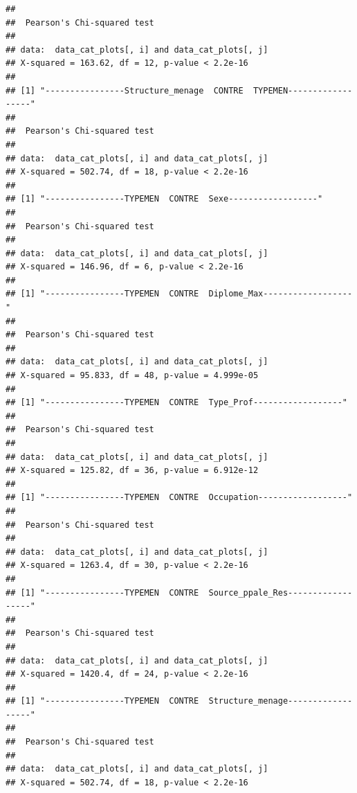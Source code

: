 \documentclass[11pt,a4paper, x11names]{article}\usepackage[]{graphicx}\usepackage[]{color}
\makeatletter
\newenvironment{kframe}{%
 \def\at@end@of@kframe{}%
 \ifinner\ifhmode%
  \def\at@end@of@kframe{\end{minipage}}%
  \begin{minipage}{\columnwidth}%
 \fi\fi%
 \def\FrameCommand##1{\hskip\@totalleftmargin \hskip-\fboxsep
 \colorbox{shadecolor}{##1}\hskip-\fboxsep
     \hskip-\linewidth \hskip-\@totalleftmargin \hskip\columnwidth}%
 \MakeFramed {\advance\hsize-\width
   \@totalleftmargin\z@ \linewidth\hsize
   \@setminipage}}%
 {\par\unskip\endMakeFramed%
 \at@end@of@kframe}
\newenvironment{knitrout}{}{} %
\makeatother
\begin{document}
\begin{knitrout}
\begin{kframe}
\begin{verbatim}
## 
## 	Pearson's Chi-squared test
## 
## data:  data_cat_plots[, i] and data_cat_plots[, j]
## X-squared = 163.62, df = 12, p-value < 2.2e-16
## 
## [1] "----------------Structure_menage  CONTRE  TYPEMEN------------------"
## 
## 	Pearson's Chi-squared test
## 
## data:  data_cat_plots[, i] and data_cat_plots[, j]
## X-squared = 502.74, df = 18, p-value < 2.2e-16
## 
## [1] "----------------TYPEMEN  CONTRE  Sexe------------------"
## 
## 	Pearson's Chi-squared test
## 
## data:  data_cat_plots[, i] and data_cat_plots[, j]
## X-squared = 146.96, df = 6, p-value < 2.2e-16
## 
## [1] "----------------TYPEMEN  CONTRE  Diplome_Max------------------"
## 
## 	Pearson's Chi-squared test
## 
## data:  data_cat_plots[, i] and data_cat_plots[, j]
## X-squared = 95.833, df = 48, p-value = 4.999e-05
## 
## [1] "----------------TYPEMEN  CONTRE  Type_Prof------------------"
## 
## 	Pearson's Chi-squared test
## 
## data:  data_cat_plots[, i] and data_cat_plots[, j]
## X-squared = 125.82, df = 36, p-value = 6.912e-12
## 
## [1] "----------------TYPEMEN  CONTRE  Occupation------------------"
## 
## 	Pearson's Chi-squared test
## 
## data:  data_cat_plots[, i] and data_cat_plots[, j]
## X-squared = 1263.4, df = 30, p-value < 2.2e-16
## 
## [1] "----------------TYPEMEN  CONTRE  Source_ppale_Res------------------"
## 
## 	Pearson's Chi-squared test
## 
## data:  data_cat_plots[, i] and data_cat_plots[, j]
## X-squared = 1420.4, df = 24, p-value < 2.2e-16
## 
## [1] "----------------TYPEMEN  CONTRE  Structure_menage------------------"
## 
## 	Pearson's Chi-squared test
## 
## data:  data_cat_plots[, i] and data_cat_plots[, j]
## X-squared = 502.74, df = 18, p-value < 2.2e-16
\end{verbatim}
\end{kframe}
\end{knitrout}
\end{document}
